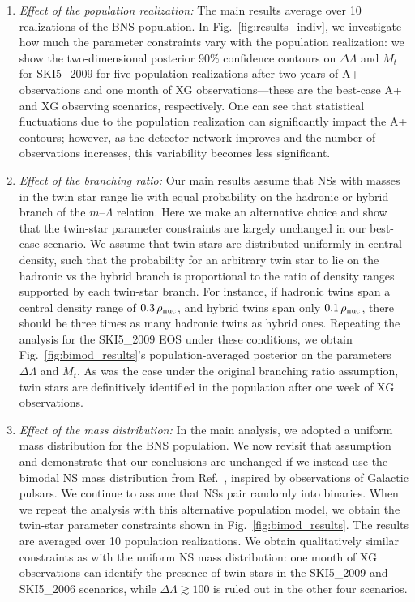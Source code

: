 \documentclass[aps,prl,twocolumn,superscriptaddress,footinbib]{revtex4-1}
\begin{document}
\begin{enumerate}
    \item \textit{Effect of the population realization:} The main results average over 10 realizations of the BNS population. In Fig.~\ref{fig:results_indiv}, we investigate how much the parameter constraints vary with the population realization: we show the two-dimensional posterior 90\% confidence contours on $\Delta\Lambda$ and $M_t$ for SKI5\_2009 for five population realizations after two years of A+ observations and one month of XG observations---these are the best-case A+ and XG observing scenarios, respectively. One can see that statistical fluctuations due to the population realization can significantly impact the A+ contours; however, as the detector network improves and the number of observations increases, this variability becomes less significant.
    
    \item \textit{Effect of the branching ratio:} Our main results assume that NSs with masses in the twin star range lie with equal probability on the hadronic or hybrid branch of the $m$--$\Lambda$ relation. Here we make an alternative choice and show that the twin-star parameter constraints are largely unchanged in our best-case scenario.  We assume that twin stars are distributed uniformly in central density, such that the probability for an arbitrary twin star to lie on the hadronic vs the hybrid branch is proportional to the ratio of density ranges supported by each twin-star branch. For instance, if hadronic twins span a central density range of $0.3\,\rho_{\rm nuc}$, and hybrid twins span only $0.1\,\rho_{\rm nuc}$, there should be three times as many hadronic twins as hybrid ones. Repeating the analysis for the SKI5\_2009 EOS under these conditions, we obtain Fig.~\ref{fig:bimod_results}'s population-averaged posterior on the parameters $\Delta\Lambda$ and $M_t$. As was the case under the original branching ratio assumption, twin stars are definitively identified in the population after one week of XG observations.

    \item \textit{Effect of the mass distribution:} In the main analysis, we adopted a uniform mass distribution for the BNS population.
    We now revisit that assumption and demonstrate that our conclusions are unchanged if we instead use the bimodal NS mass distribution from Ref.~\cite{FarrChatziioannou2020}, inspired by observations of Galactic pulsars. We continue to assume that NSs pair randomly into binaries.
    When we repeat the analysis with this alternative population model, we obtain the twin-star parameter constraints shown in Fig.~\ref{fig:bimod_results}.
    The results are averaged over 10 population realizations.
    We obtain qualitatively similar constraints as with the uniform NS mass distribution: one month of XG observations can identify the presence of twin stars in the SKI5\_2009 and SKI5\_2006 scenarios, while $\Delta\Lambda \gtrsim 100$ is ruled out in the other four scenarios.
    
\end{enumerate}
\end{document}

